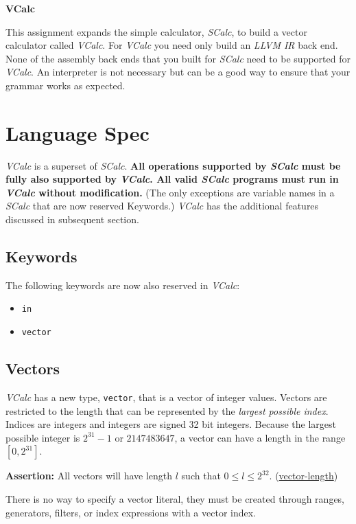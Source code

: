 \documentclass{article}
\newcommand{\code}[1]{\texttt{\textmd{#1}}}
\newcommand{\assertion}[2]{\textbf{Assertion: }#1 (\hyperlink{#2}{#2})}
\begin{document}
\ifpdf
  \LARGE
  \textbf{VCalc}
  \normalsize
\fi


This assignment expands the simple calculator, \textit{SCalc}, to build a vector calculator called
\textit{VCalc}. For \textit{VCalc} you need only build an \textit{LLVM IR} back end. None of the
assembly back ends that you built for \textit{SCalc} need to be supported for \textit{VCalc}. An
interpreter is not necessary but can be a good way to ensure that your grammar works as expected.

\section{Language Spec}
\textit{VCalc} is a superset of \textit{SCalc}. \textbf{All operations supported by \textit{SCalc}
must be fully also supported by \textit{VCalc}. All valid \textit{SCalc} programs must run in
\textit{VCalc} without modification.} (The only exceptions are variable names in a \textit{SCalc}
that are now reserved Keywords.) \textit{VCalc} has the additional features discussed in subsequent
section.

\subsection{Keywords}
The following keywords are now also reserved in \textit{VCalc}:
\begin{itemize}
  \item \code{in}
  \item \code{vector}
\end{itemize}

\subsection{Vectors}
\textit{VCalc} has a new type, \code{vector}, that is a vector of integer values. Vectors are
restricted to the length that can be represented by the \textit{largest possible index}. Indices are
integers and integers are signed 32 bit integers. Because the largest possible integer is $2^{31} - 1$
or $2147483647$, a vector can have a length in the range $[0, 2^{31}]$.

\assertion{All vectors will have length $l$ such that $0 \leq l \leq 2^{32}$.}{vector-length}

There is no way to specify a vector literal, they must be created through ranges, generators,
filters, or index expressions with a vector index.
\end{document}
